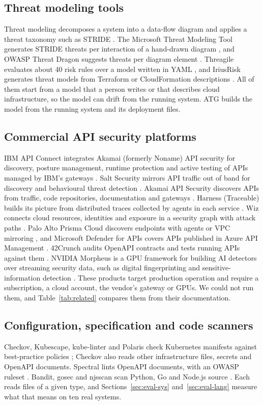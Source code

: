 \documentclass[conference]{IEEEtran}
\begin{document}
\subsection{Threat modeling tools}
Threat modeling decomposes a system into a data-flow diagram and applies a threat taxonomy such as STRIDE \cite{shostack}. The Microsoft Threat Modeling Tool generates STRIDE threats per interaction of a hand-drawn diagram \cite{ms_tmt}, and OWASP Threat Dragon suggests threats per diagram element \cite{threat_dragon}. Threagile evaluates about 40 risk rules over a model written in YAML \cite{threagile}, and IriusRisk generates threat models from Terraform or CloudFormation descriptions \cite{iriusrisk}. All of them start from a model that a person writes or that describes cloud infrastructure, so the model can drift from the running system. ATG builds the model from the running system and its deployment files.

\subsection{Commercial API security platforms}
IBM API Connect integrates Akamai (formerly Noname) API security for discovery, posture management, runtime protection and active testing of APIs managed by IBM's gateways \cite{ibm_apic}. Salt Security mirrors API traffic out of band for discovery and behavioural threat detection \cite{salt}. Akamai API Security discovers APIs from traffic, code repositories, documentation and gateways \cite{akamai_api}. Harness (Traceable) builds its picture from distributed traces collected by agents in each service \cite{traceable}. Wiz connects cloud resources, identities and exposure in a security graph with attack paths \cite{wiz}. Palo Alto Prisma Cloud discovers endpoints with agents or VPC mirroring \cite{prisma}, and Microsoft Defender for APIs covers APIs published in Azure API Management \cite{defender_apis}. 42Crunch audits OpenAPI contracts and tests running APIs against them \cite{crunch42}. NVIDIA Morpheus is a GPU framework for building AI detectors over streaming security data, such as digital fingerprinting and sensitive-information detection \cite{morpheus}. These products target production operation and require a subscription, a cloud account, the vendor's gateway or GPUs. We could not run them, and Table~\ref{tab:related} compares them from their documentation.

\subsection{Configuration, specification and code scanners}
Checkov, Kubescape, kube-linter and Polaris check Kubernetes manifests against best-practice policies \cite{checkov,kubescape,kubelinter,polaris}; Checkov also reads other infrastructure files, secrets and OpenAPI documents. Spectral lints OpenAPI documents, with an OWASP ruleset \cite{spectral}. Bandit, gosec and njsscan scan Python, Go and Node.js source \cite{bandit,gosec,njsscan}. Each reads files of a given type, and Sections~\ref{sec:eval-sys} and~\ref{sec:eval-lang} measure what that means on ten real systems.
\end{document}
